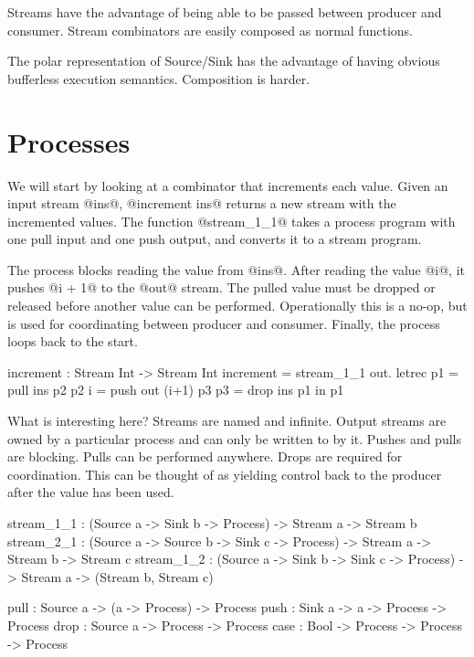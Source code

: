 Streams have the advantage of being able to be passed between producer and consumer.
Stream combinators are easily composed as normal functions.

The polar representation of Source/Sink has the advantage of having obvious bufferless execution semantics.
Composition is harder.



\section{Processes}
\label{s:Process}
We will start by looking at a combinator that increments each value.
Given an input stream @ins@, @increment ins@ returns a new stream with the incremented values.
The function @stream_1_1@ takes a process program with one pull input and one push output, and converts it to a stream program.

The process blocks reading the value from @ins@.
After reading the value @i@, it pushes @i + 1@ to the @out@ stream.
The pulled value must be dropped or released before another value can be performed.
Operationally this is a no-op, but is used for coordinating between producer and consumer.
Finally, the process loops back to the start.

\begin{code}
increment : Stream Int -> Stream Int
increment = stream_1_1 \ins out.
  letrec
    p1   = pull ins       p2
    p2 i = push out (i+1) p3
    p3   = drop ins       p1
  in p1
\end{code}

What is interesting here?
Streams are named and infinite.
Output streams are owned by a particular process and can only be written to by it.
Pushes and pulls are blocking.
Pulls can be performed anywhere.
Drops are required for coordination.
This can be thought of as yielding control back to the producer after the value has been used.

\begin{code}
stream_1_1 : (Source a -> Sink b
              -> Process)
          -> Stream a -> Stream b
stream_2_1 : (Source a -> Source b -> Sink c
              -> Process)
          -> Stream a -> Stream b -> Stream c
stream_1_2 : (Source a -> Sink b -> Sink c
              -> Process)
          -> Stream a -> (Stream b, Stream c)

pull : Source a -> (a -> Process) -> Process
push : Sink   a ->  a -> Process  -> Process
drop : Source a ->       Process  -> Process
case : Bool -> Process -> Process -> Process
\end{code}

